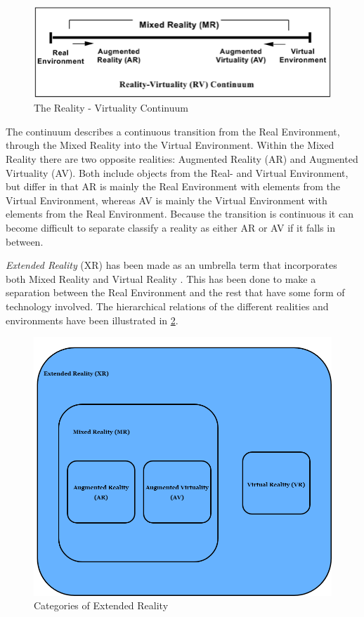         \begin{figure}[!ht]
            \centering
            \includegraphics[width=\linewidth]{figures/reality_virtuality_continuum.png}
            \caption{The Reality - Virtuality Continuum}
            \label{fig:reality_virtuality_continuum}
        \end{figure}
        
        The continuum describes a continuous transition from the Real Environment, through the Mixed Reality into the Virtual Environment. Within the Mixed Reality there are two opposite realities: Augmented Reality (AR) and Augmented Virtuality (AV). Both include objects from the Real- and Virtual Environment, but differ in that AR is mainly the Real Environment with elements from the Virtual Environment, whereas AV is mainly the Virtual Environment with elements from the Real Environment. Because the transition is continuous it can become difficult to separate classify a reality as either AR or AV if it falls in between.
        
        \emph{Extended Reality} (XR) has been made as an umbrella term that incorporates both Mixed Reality and Virtual Reality \cite{xr}. This has been done to make a separation between the Real Environment and the rest that have some form of technology involved. The hierarchical relations of the different realities and environments have been illustrated in \cref{fig:xr}.
        
        \FloatBarrier
        \begin{figure}[!ht]
            \centering
            \includegraphics[width=0.7\linewidth]{figures/XR.png}
            \caption{Categories of Extended Reality}
            \label{fig:xr}
        \end{figure}
        \FloatBarrier
        

